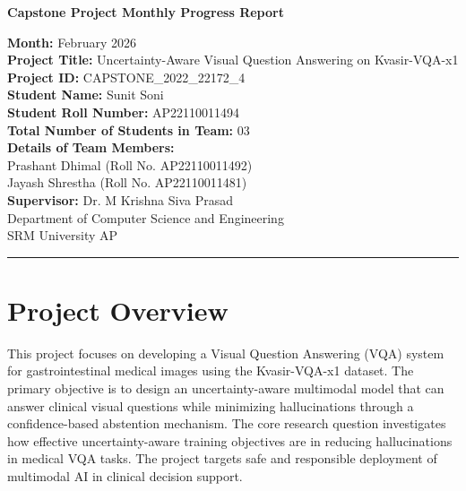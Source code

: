 \documentclass[12pt,a4paper]{article}
\begin{document}
\begin{center}
    \Large \textbf{Capstone Project Monthly Progress Report}\\[0.5cm]
    \normalsize
    
    \textbf{Month:} February 2026 \\[0.5cm]
    \textbf{Project Title:} Uncertainty-Aware Visual Question Answering on Kvasir-VQA-x1 \\[0.5cm]
    \textbf{Project ID:} CAPSTONE\_2022\_22172\_4 \\[0.5cm]
    \textbf{Student Name:} Sunit Soni \\
    \textbf{Student Roll Number:} AP22110011494 \\

    \textbf{Total Number of Students in Team:} 03 \\
    \textbf{Details of Team Members:}\\
       Prashant Dhimal (Roll No. AP22110011492)\\
       Jayash Shrestha (Roll No. AP22110011481)\\[0.5cm]
    \textbf{Supervisor:} Dr. M Krishna Siva Prasad \\[0.5cm]
    Department of Computer Science and Engineering\\
    SRM University AP
\end{center}

\hrule
\vspace{1cm}

\section{Project Overview}
This project focuses on developing a Visual Question Answering (VQA) system for gastrointestinal medical images using the Kvasir-VQA-x1 dataset. The primary objective is to design an uncertainty-aware multimodal model that can answer clinical visual questions while minimizing hallucinations through a confidence-based abstention mechanism. The core research question investigates how effective uncertainty-aware training objectives are in reducing hallucinations in medical VQA tasks. The project targets safe and responsible deployment of multimodal AI in clinical decision support.
\end{document}
